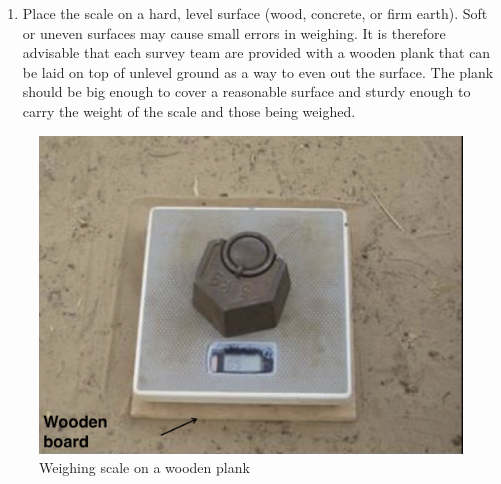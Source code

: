 \documentclass[
  12pt,
]{book}
\providecommand{\tightlist}{%
  \setlength{\itemsep}{0pt}\setlength{\parskip}{0pt}}
\begin{document}
\begin{enumerate}
\def\labelenumi{\arabic{enumi}.}
\tightlist
\item
  Place the scale on a hard, level surface (wood, concrete, or firm earth). Soft or uneven surfaces may cause small errors in weighing. It is therefore advisable that each survey team are provided with a wooden plank that can be laid on top of unlevel ground as a way to even out the surface. The plank should be big enough to cover a reasonable surface and sturdy enough to carry the weight of the scale and those being weighed.
\end{enumerate}

\begin{figure}

{\centering \includegraphics[width=0.5\linewidth]{images/weight01} 

}

\caption{Weighing scale on a wooden plank}\label{fig:weight5}
\end{figure}
\end{document}

